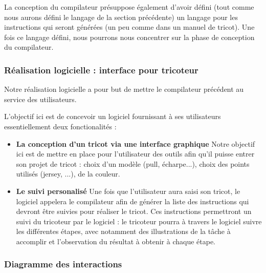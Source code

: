 \documentclass{article}
\begin{document}
La conception du compilateur présuppose également d'avoir défini (tout comme nous aurons défini le langage de la section précédente) un
langage pour les instructions qui seront générées (un peu comme dans un manuel de tricot).
Une fois ce langage défini, nous pourrons nous concentrer sur la phase de conception du compilateur.

\subsubsection{Réalisation logicielle : interface pour tricoteur}

Notre réalisation logicielle a pour but de mettre le compilateur précédent au service des utilisateurs.

L'objectif ici est de concevoir un logiciel fournissant à ses utilisateurs essentiellement deux fonctionalités :
\begin{itemize}
  \item \textbf{La conception d'un tricot via une interface graphique} Notre objectif ici est de mettre en place pour l'utilisateur des
  outils afin qu'il puisse entrer son projet de tricot : choix d'un modèle (pull, écharpe...), choix des points utilisés
  (jersey, ...), de la couleur.
  \item \textbf{Le suivi personalisé} Une fois que l'utilisateur aura saisi son tricot, le logiciel appelera le compilateur afin de générer
la liste des instructions qui devront être suivies pour réaliser le tricot. Ces instructions permettront un suivi du tricoteur par le
logiciel : le tricoteur pourra à travers le logiciel suivre les différentes étapes, avec notamment des illustrations de la tâche à
accomplir et l'observation du résultat à obtenir à chaque étape.
\end{itemize}

\subsubsection{Diagramme des interactions}
\end{document}
